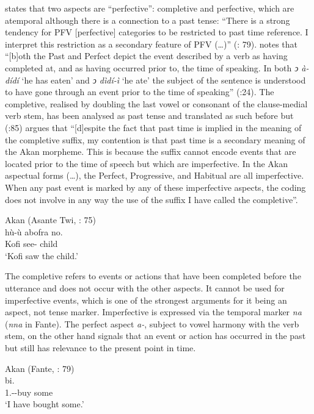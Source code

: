 \documentclass[output=paper]{langscibook}
\begin{document}
\citet{osam2008} states that two aspects are “perfective”: completive and perfective, which are atemporal although there is a connection to a past tense: “There is a strong tendency for PFV [perfective] categories to be restricted to past time reference. I interpret this restriction as a secondary feature of PFV (…)” (\citealt{dahl1985}: 79). \citet{boadi2008} notes that “[b]oth the Past and Perfect depict the event described by a verb as having completed at, and as having occurred prior to, the time of speaking. In both \emph{ͻ à-dídí} ‘he has eaten’ and\emph{ ͻ dìdí-ì} ‘he ate’ the subject of the sentence is understood to have gone through an event prior to the time of speaking” (\citeyear{boadi2008}:24).
The completive, realised by doubling the last vowel or consonant of the clause-medial verb stem, has been analysed as past tense and translated as such before but \citeauthor{osam2008} (\citeyear{osam2008}:85) argues that “[d]espite the fact that past time is implied in the meaning of the completive suffix, my contention is that past time is a secondary meaning of the Akan morpheme. This is because the suffix cannot encode events that are located prior to the time of speech but which are imperfective. In the Akan aspectual forms (…), the Perfect, Progressive, and Habitual are all imperfective. When any past event is marked by any of these imperfective aspects, the coding does not involve in any way the use of the suffix I have called the completive”.

\begin{exe}
\ex \label{Paj8} Akan (Asante Twi, \citealt{osam2008}: 75) \\ 
 {hù-ù} {abofra} {no.}\\
    Kofi see-{\compl} child \\
\glt `Kofi saw the child.’\\
\end{exe}


The completive refers to events or actions that have been completed before the utterance and does not occur with the other aspects. It cannot be used for imperfective events, which is one of the strongest arguments for it being an aspect, not tense marker. Imperfective is expressed via the temporal marker \emph{na} (\emph{nna} in Fante). 
The perfect aspect \emph{a-}, subject to vowel harmony with the verb stem, on the other hand signals that an event or action has occurred in the past but still has relevance to the present point in time.

\begin{exe}
\ex \label{Paj9} Akan (Fante, \citealt{osam2008}: 79) \\ 
 {bi.}\\
    1{\sg}.{\subj}--buy some\\
\glt `I have bought some.’\\
\end{exe}
\end{document}
